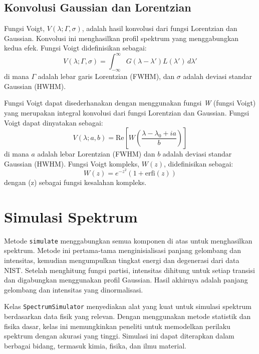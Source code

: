 \subsection{Konvolusi Gaussian dan Lorentzian}
\par Fungsi Voigt, \( V(\lambda; \Gamma, \sigma) \), adalah hasil konvolusi dari fungsi Lorentzian dan Gaussian. Konvolusi ini menghasilkan profil spektrum yang menggabungkan kedua efek. Fungsi Voigt didefinisikan sebagai:
\begin{equation}
V(\lambda; \Gamma, \sigma) = \int_{-\infty}^{\infty} G(\lambda - \lambda') L(\lambda') \, d\lambda'
\end{equation}
di mana \( \Gamma \) adalah lebar garis Lorentzian (FWHM), dan \( \sigma \) adalah deviasi standar Gaussian (HWHM).

\par Fungsi Voigt dapat disederhanakan dengan menggunakan fungsi \textit{W} (fungsi Voigt) yang merupakan integral konvolusi dari fungsi Lorentzian dan Gaussian. Fungsi Voigt dapat dinyatakan sebagai: \citep{Godio2016}
\begin{equation}
V(\lambda; a, b) = \text{Re} \left[ W\left(\frac{\lambda - \lambda_0 + i a}{b}\right) \right]
\end{equation}
di mana \( a \) adalah lebar Lorentzian (FWHM) dan \( b \) adalah deviasi standar Gaussian (HWHM). Fungsi Voigt kompleks, \( W(z) \), didefinisikan sebagai:
\begin{equation}
W(z) = e^{-z^2} \left( 1 + \text{erfi}(z) \right)
\end{equation}
dengan (z) sebagai fungsi kesalahan kompleks.

\section{Simulasi Spektrum}
\par Metode \texttt{simulate} menggabungkan semua komponen di atas untuk menghasilkan spektrum. Metode ini pertama-tama menginisialisasi panjang gelombang dan intensitas, kemudian mengumpulkan tingkat energi dan degenerasi dari data NIST. Setelah menghitung fungsi partisi, intensitas dihitung untuk setiap transisi dan digabungkan menggunakan profil Gaussian. Hasil akhirnya adalah panjang gelombang dan intensitas yang dinormalisasi.

\par Kelas \texttt{SpectrumSimulator} menyediakan alat yang kuat untuk simulasi spektrum berdasarkan data fisik yang relevan. Dengan menggunakan metode statistik dan fisika dasar, kelas ini memungkinkan peneliti untuk memodelkan perilaku spektrum dengan akurasi yang tinggi. Simulasi ini dapat diterapkan dalam berbagai bidang, termasuk kimia, fisika, dan ilmu material.
